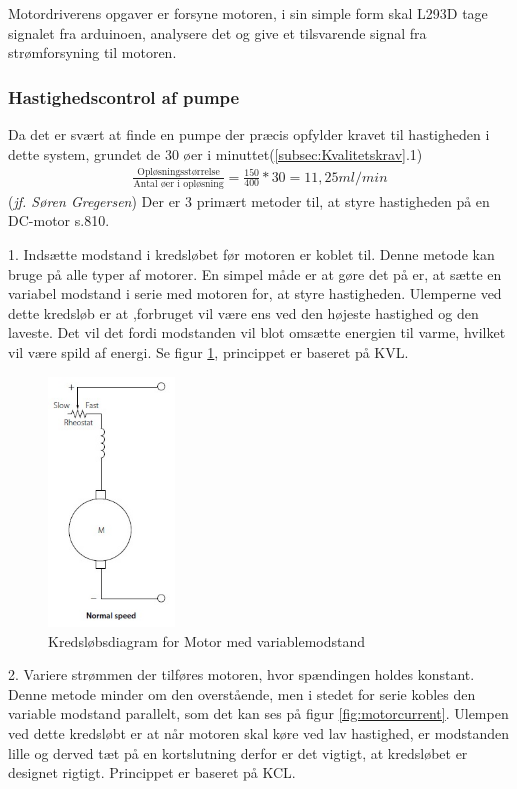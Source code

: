 Motordriverens opgaver er forsyne motoren, i sin simple form skal L293D tage signalet fra arduinoen, analysere det og give et tilsvarende signal fra strømforsyning til motoren.
\subsubsection{Hastighedscontrol af pumpe}
Da det er svært at finde en pumpe der præcis opfylder kravet til hastigheden i dette system, grundet de 30 øer i minuttet(\ref{subsec:Kvalitetskrav}.1)
\begin{align}
\frac{\text{Opløsningsstørrelse}}{\text{Antal øer i opløsning}} = \frac{150}{400}*30 = 11,25ml/min
\label{eg:ohastighed}
\end{align}(\textit{jf. Søren Gregersen})
Der er 3 primært metoder til, at styre hastigheden på en DC-motor \citep{ELengbog}s.810.

1. Indsætte modstand i kredsløbet før motoren er koblet til.
Denne metode kan bruge på alle typer af motorer. En simpel måde er at gøre det på er, at sætte en variabel modstand i serie med motoren for, at styre hastigheden. Ulemperne ved dette kredsløb er at ,forbruget vil være ens ved den højeste hastighed og den laveste. Det vil det fordi modstanden vil blot omsætte energien til varme, hvilket vil være spild af energi. Se figur \ref{fig:motormodstand}, princippet er baseret på KVL.

\begin{figure}[H]
	\centering
	\includegraphics[width=0.3\textwidth]{billeder/Hardware/motormodstand.jpg}
	\caption{Kredsløbsdiagram for Motor med variablemodstand}
	\label{fig:motormodstand}
\end{figure}

2. Variere strømmen der tilføres motoren, hvor spændingen holdes konstant.
Denne metode minder om den overstående, men i stedet for serie kobles den variable modstand parallelt, som det kan ses på figur \ref{fig:motorcurrent}. Ulempen ved dette kredsløbt er at når motoren skal køre ved lav hastighed, er modstanden lille og derved tæt på en kortslutning derfor er det vigtigt, at kredsløbet er designet rigtigt. Princippet er baseret på KCL.

